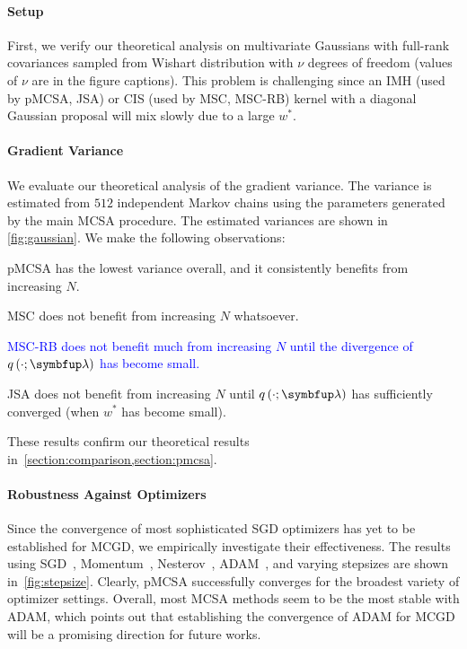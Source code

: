 \paragraph{Setup}
First, we verify our theoretical analysis on multivariate Gaussians with full-rank covariances sampled from Wishart distribution with \(\nu\) degrees of freedom (values of \(\nu\) are in the figure captions).
This problem is challenging since an IMH (used by pMCSA, JSA) or CIS (used by MSC, MSC-RB) kernel with a diagonal Gaussian proposal will mix slowly due to a large \(w^*\).

\vspace{-0.1in}
\paragraph{Gradient Variance}
We evaluate our theoretical analysis of the gradient variance.
The variance is estimated from \(512\) independent Markov chains using the parameters generated by the main MCSA procedure.
The estimated variances are shown in \cref{fig:gaussian}.
We make the following observations:
\begin{enumerate*}[label=\textbf{(\roman*)}]
  \item pMCSA has the lowest variance overall, and it consistently benefits from increasing \(N\).
  \item MSC does not benefit from increasing \(N\) whatsoever.
    \textcolor{blue}{
  \item MSC-RB does not benefit much from increasing \(N\) until the divergence of \(q\left(\cdot; \vlambda\right)\) has become small.
    }
  \item JSA does not benefit from increasing \(N\) until \(q\left(\cdot; \vlambda\right)\) has sufficiently converged (when \(w^*\) has become small).
\end{enumerate*}
These results confirm our theoretical results in~\cref{section:comparison,section:pmcsa}.

\vspace{-0.1in}
\paragraph{Robustness Against Optimizers}
Since the convergence of most sophisticated SGD optimizers has yet to be established for MCGD, we empirically investigate their effectiveness.
The results using SGD~\citep{robbins_stochastic_1951, bottou_optimization_2018a}, Momentum~\citep{polyak_methods_1964}, Nesterov~\citep{nesterov_method_1983}, ADAM~\citep{kingma_adam_2015}, and varying stepsizes are shown in~\cref{fig:stepsize}.
Clearly, pMCSA successfully converges for the broadest variety of optimizer settings.
Overall, most MCSA methods seem to be the most stable with ADAM, which points out that establishing the convergence of ADAM for MCGD will be a promising direction for future works.


